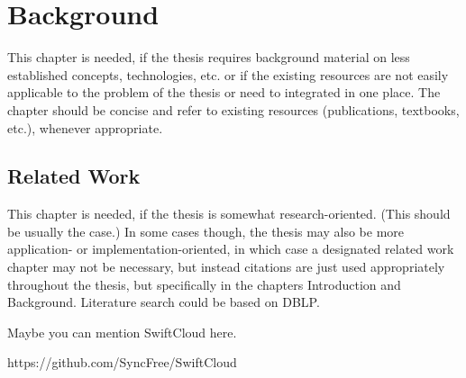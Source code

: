 \chapter{Background}
\label{Background}

This chapter is needed, if the thesis requires background material on less established concepts, technologies, etc. or if the existing resources are not easily applicable to the problem of the thesis or need to integrated in one place. The chapter should be concise and refer to existing resources (publications, textbooks, etc.), whenever appropriate.

\section{Related Work}

This chapter is needed, if the thesis is somewhat research-oriented. (This should be usually the case.) In some cases though, the thesis may also be more application- or implementation-oriented, in which case a designated related work chapter may not be necessary, but instead citations are just used appropriately throughout the thesis, but specifically in the chapters Introduction and Background. Literature search could be based on DBLP.

Maybe you can mention SwiftCloud here.

https://github.com/SyncFree/SwiftCloud

